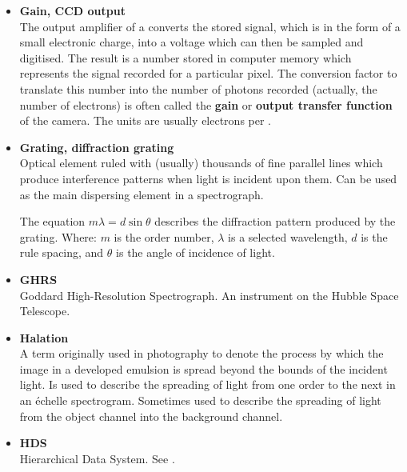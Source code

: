 {{\begin{itemize}
      In an \'{e}chelle instrument:  the part of an order spectrum which
      `belongs' to that order, {\it{i.e.}}, the wavelength range over
      which this order is the brightest of the orders in the
      .

\item {\bf\label{gl_gain}Gain, CCD output}\\
      The output amplifier of a  converts the stored
      signal, which is in the form of a small electronic charge, into
      a voltage which can then be sampled and digitised.  The result
      is a number stored in computer memory which represents the signal
      recorded for a particular pixel.  The conversion factor to
      translate this number into the number of photons recorded
      (actually, the number of electrons) is often called the {\bf gain}
      or {\bf output transfer function} of the camera.  The units are
      usually electrons per \@.

\item {\bf\label{gl_grating}Grating, diffraction grating}\\
      Optical element ruled with (usually) thousands of fine parallel
      lines which produce interference patterns when light is incident
      upon them.  Can be used as the main dispersing element in a
      spectrograph.

      The equation $m\lambda = d\sin\theta$ describes the diffraction
      pattern produced by the grating.  Where: $m$ is the order number,
      $\lambda$ is a selected wavelength, $d$ is the rule spacing, and
      $\theta$ is the angle of incidence of light.

\item {\bf\label{gl_ghrs}GHRS}\\
      Goddard High-Resolution Spectrograph.  An instrument on the
      Hubble Space Telescope.

\item {\bf\label{gl_halation}Halation}\\
      A term originally used in photography to denote the process by which
      the image in a developed emulsion is spread beyond the bounds of the
      incident light.  Is used to describe the spreading of light from
      one order to the next in an \'{e}chelle spectrogram.  Sometimes used
      to describe the spreading of light from the object channel into the
      background channel.

\item {\bf\label{gl_hds}HDS}\\
      Hierarchical Data System.  See .


\end{itemize}}}
